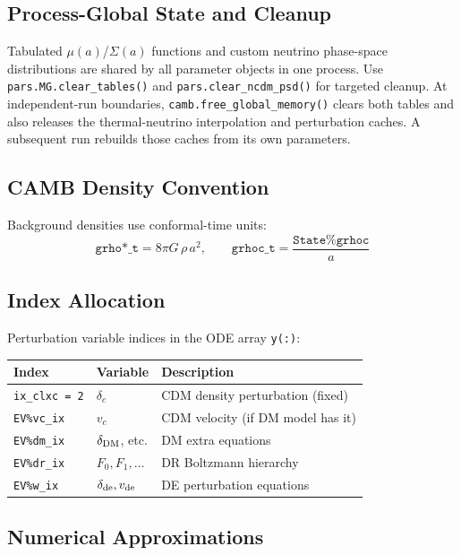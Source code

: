 \documentclass[11pt,a4paper]{article}
\begin{document}
\subsection{Process-Global State and Cleanup}

Tabulated $\mu(a)$/$\Sigma(a)$ functions and custom neutrino phase-space
distributions are shared by all parameter objects in one process. Use
\texttt{pars.MG.clear\_tables()} and \texttt{pars.clear\_ncdm\_psd()} for
targeted cleanup. At independent-run boundaries,
\texttt{camb.free\_global\_memory()} clears both tables and also releases the
thermal-neutrino interpolation and perturbation caches. A subsequent run
rebuilds those caches from its own parameters.

\subsection{CAMB Density Convention}

Background densities use conformal-time units:
\begin{equation}
    \texttt{grho*\_t} = 8\pi G\, \rho\, a^2, \qquad \texttt{grhoc\_t} = \frac{\texttt{State\%grhoc}}{a}
\end{equation}

\subsection{Index Allocation}

Perturbation variable indices in the ODE array \texttt{y(:)}:
\begin{center}
\small
\begin{tabular}{lll}
\toprule
Index & Variable & Description \\
\midrule
\texttt{ix\_clxc = 2} & $\delta_c$ & CDM density perturbation (fixed) \\
\texttt{EV\%vc\_ix} & $v_c$ & CDM velocity (if DM model has it) \\
\texttt{EV\%dm\_ix} & $\delta_{\rm DM}$, etc. & DM extra equations \\
\texttt{EV\%dr\_ix} & $F_0, F_1, \ldots$ & DR Boltzmann hierarchy \\
\texttt{EV\%w\_ix} & $\delta_{\rm de}, v_{\rm de}$ & DE perturbation equations \\
\bottomrule
\end{tabular}
\end{center}

\subsection{Numerical Approximations}
\end{document}
